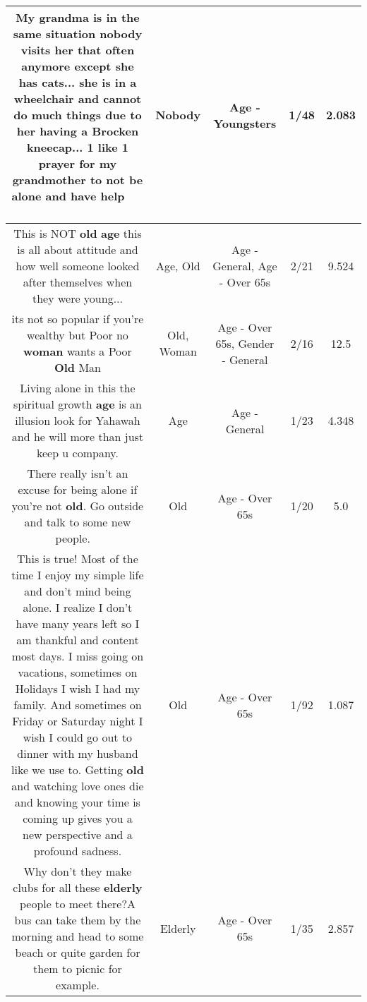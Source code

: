 \documentclass[11pt]{article}
\newlength\mylength
\begin{document}
\begin{center}
\begin{longtable}{|C{.65\mylength}|C{.30\mylength}|C{.12\mylength}|C{.12\mylength}|C{.12\mylength}|}
  \small My grandma is in the same situation \textbf{nobody} visits her that often anymore except she has cats...  she is in a wheelchair and cannot do much things  due to her having a Brocken kneecap... 1 like 1 prayer for my grandmother to not be alone and have help🙏🏻🙏🏻🙏🏻🙏🏻🙏🏻🙏🏻\normalsize   & Nobody & Age - Youngsters & 1/48 & 2.083 \\  \hline
  \small This is NOT \textbf{old} \textbf{age} this is all about attitude and how well someone looked after themselves when they were young...\normalsize   & Age, Old & Age - General, Age - Over 65s & 2/21 & 9.524 \\  \hline
  \small its not so popular if you're wealthy but Poor no \textbf{woman} wants a Poor \textbf{Old} Man\normalsize   & Old, Woman & Age - Over 65s, Gender - General & 2/16 & 12.5 \\  \hline
  \small Living alone in this the spiritual growth \textbf{age} is an illusion look for Yahawah and he will more than just keep u company.\normalsize   & Age & Age - General & 1/23 & 4.348 \\  \hline
  \small There really isn't an excuse for being alone if you're not \textbf{old}. Go outside and talk to some new people.🤷🏽‍♂️\normalsize   & Old & Age - Over 65s & 1/20 & 5.0 \\  \hline
  \small This is true! Most of the time I enjoy my simple life and don't mind being alone. I realize I don't have many years left so I am thankful and content most days. I miss going on vacations, sometimes on Holidays I wish I had my family. And sometimes on Friday or Saturday night I wish I could go out to dinner with my husband like we use to. Getting \textbf{old} and watching love ones die and knowing your time is coming up gives you a new perspective and a profound sadness.\normalsize   & Old & Age - Over 65s & 1/92 & 1.087 \\  \hline
  \small Why don't they make clubs for all these \textbf{elderly} people to meet there?A bus can take them by the morning and head to some beach or quite garden for them to picnic for example.\normalsize   & Elderly & Age - Over 65s & 1/35 & 2.857 \\  \hline

\end{longtable}
\end{center}
\end{document}
